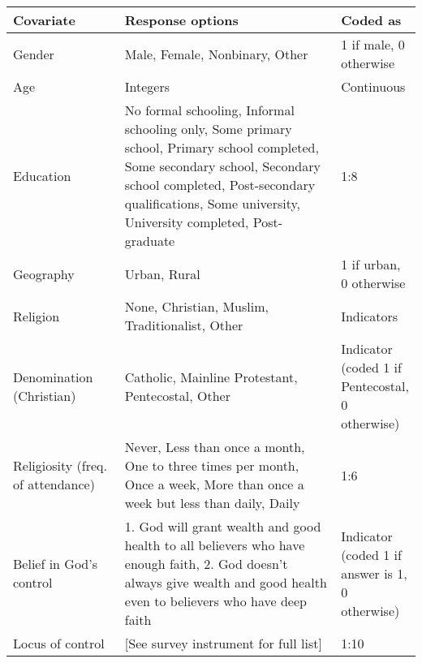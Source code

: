 \begin{table}[H]
\begin{adjustbox}{totalheight=.9\baselineskip, max width = \textwidth}
\begin{tabular}{p{0.3\linewidth}p{0.7\linewidth}p{0.25\linewidth}}
\textbf{Covariate}                   & \textbf{Response options} & \textbf{Coded as}                                     \\
\hline
Gender                                      & Male,   Female, Nonbinary, Other                           & 1 if male, 0 otherwise  \\
Age                                         & Integers                                                   & Continuous              \\
Education &
  No   formal schooling, Informal schooling only, Some primary school, Primary   school completed, Some secondary school, Secondary school completed,   Post-secondary qualifications, Some university, University completed,   Post-graduate &
  1:8 \\
Geography                                   & Urban, Rural                                 & 1 if urban, 0 otherwise \\
Religion                                    & None,   Christian, Muslim, Traditionalist, Other                           & Indicators              \\
Denomination (Christian)  & Catholic, Mainline Protestant, Pentecostal, Other  & Indicator (coded 1 if Pentecostal, 0 otherwise)\\
Religiosity   (freq. of attendance) &
  Never,   Less than once a month, One to three times per month, Once a week, More than   once a week but less than daily, Daily &
  1:6 \\
 Belief in God's control & 1. God will grant wealth and good health to all believers who have enough faith, 2. God doesn't always give wealth and good health even to believers who have deep faith & Indicator (coded 1 if answer is 1, 0 otherwise)\\
 Locus of control & 
[See survey instrument for full list] & 1:10\\

\end{tabular}
\end{adjustbox}
\end{table}
